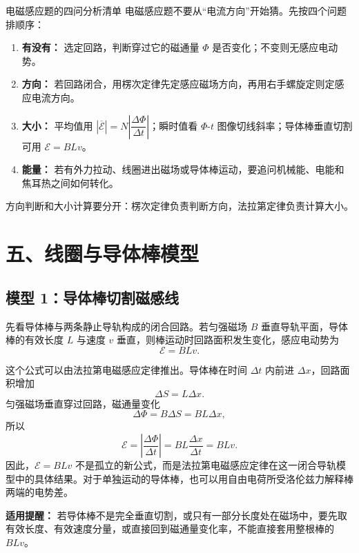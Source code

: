 \begin{learningbox}{电磁感应题的四问分析清单}
电磁感应题不要从“电流方向”开始猜。先按四个问题排顺序：
\begin{enumerate}
  \item \textbf{有没有：} 选定回路，判断穿过它的磁通量 $\Phi$ 是否变化；不变则无感应电动势。
  \item \textbf{方向：} 若回路闭合，用楞次定律先定感应磁场方向，再用右手螺旋定则定感应电流方向。
  \item \textbf{大小：} 平均值用 $\left|\overline{\mathcal E}\right|=N\left|\dfrac{\Delta\Phi}{\Delta t}\right|$；瞬时值看 $\Phi$-$t$ 图像切线斜率；导体棒垂直切割可用 $\mathcal E=BLv$。
  \item \textbf{能量：} 若有外力拉动、线圈进出磁场或导体棒运动，要追问机械能、电能和焦耳热之间如何转化。
\end{enumerate}
方向判断和大小计算要分开：楞次定律负责判断方向，法拉第定律负责计算大小。
\end{learningbox}

\section*{五、线圈与导体棒模型}

\subsection*{模型 1：导体棒切割磁感线}

先看导体棒与两条静止导轨构成的闭合回路。若匀强磁场 $B$ 垂直导轨平面，导体棒的有效长度 $L$ 与速度 $v$ 垂直，则棒运动时回路面积发生变化，感应电动势为
\[
\boxed{\mathcal E=BLv}.
\]

这个公式可以由法拉第电磁感应定律推出。导体棒在时间 $\Delta t$ 内前进 $\Delta x$，回路面积增加
\[
\Delta S=L\Delta x.
\]
匀强磁场垂直穿过回路，磁通量变化
\[
\Delta\Phi=B\Delta S=BL\Delta x,
\]
所以
\[
\mathcal E=\left|\frac{\Delta\Phi}{\Delta t}\right|=BL\frac{\Delta x}{\Delta t}=BLv.
\]
因此，$\mathcal E=BLv$ 不是孤立的新公式，而是法拉第电磁感应定律在这一闭合导轨模型中的具体结果。对于单独运动的导体棒，也可以用自由电荷所受洛伦兹力解释棒两端的电势差。

\textbf{适用提醒：} 若导体棒不是完全垂直切割，或只有一部分长度处在磁场中，要先取有效长度、有效速度分量，或直接回到磁通量变化率，不能直接套用整根棒的 $BLv$。

\begin{center}


\label{fig:motional-emf-rail}
\end{center}


